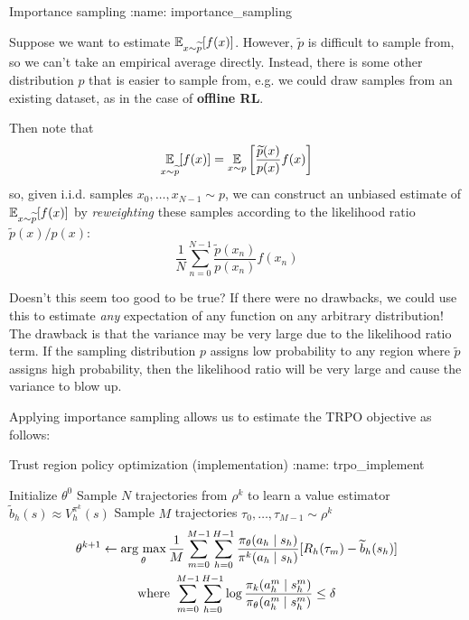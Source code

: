 \documentclass[\main/main]{subfiles}
\begin{document}
\begin{definition}{Importance sampling}
:name: importance_sampling

    Suppose we want to estimate $\operatorname*{\mathbb{E}}_{x \sim \widetilde p}[f(x)]$.
    However, $\tilde p$ is difficult to sample from, so we can't take an empirical average directly. Instead, there is some other distribution $p$ that is easier to sample from, e.g. we could draw samples from an existing dataset, as in the case of \textbf{offline RL}.

    Then note that
    \[
        \operatorname*{\mathbb{E}}_{x \sim \widetilde p} [f(x)] = \operatorname*{\mathbb{E}}_{x \sim p}\left[ \frac{\widetilde p(x)}{p(x)} f(x) \right]
    \]
    so, given i.i.d. samples $x_0, \dots, x_{N-1} \sim p$, we can construct an unbiased estimate of $\operatorname*{\mathbb{E}}_{x \sim \widetilde p} [f(x)]$ by \emph{reweighting} these samples according to the likelihood ratio $\tilde p(x)/p(x)$:
    \[
        \frac{1}{N} \sum_{n=0}^{N-1} \frac{\tilde p(x_n)}{p(x_n)} f(x_n)
    \]

    Doesn't this seem too good to be true? If there were no drawbacks, we could use this to estimate \emph{any} expectation of any function on any arbitrary distribution!
    The drawback is that the variance may be very large due to the likelihood ratio term. If the sampling distribution $p$ assigns low probability to any region where $\tilde p$ assigns high probability, then the likelihood ratio will be very large and cause the variance to blow up.
\end{definition}

Applying importance sampling allows us to estimate the TRPO objective as follows:

\begin{definition}{Trust region policy optimization (implementation)}
:name: trpo_implement

    \begin{algorithmic}
        \State Initialize $\theta^0$
        \State Sample $N$ trajectories from $\rho^k$ to learn a value estimator $\tilde b_h(s) \approx V^{\pi^k}_h(s)$
        \State Sample $M$ trajectories $\tau_0, \dots, \tau_{M-1} \sim \rho^k$
        \State \begin{gather*}
            \theta^{k+1} \gets \operatorname*{\textrm{arg\ max}}_{\theta} \frac{1}{M} \sum_{m=0}^{M-1} \sum_{h=0}^{H-1} \frac{\pi_\theta(a_h \mid s_h)}{\pi^k(a_h \mid s_h)} [ R_h(\tau_m) - \widetilde b_h(s_h) ] \\
            \text{where } \sum_{m=0}^{M-1} \sum_{h=0}^{H-1} \log \frac{\pi_k(a_h^m \mid s_h^m)}{\pi_\theta(a_h^m \mid s_h^m)} \le \delta
        \end{gather*}
        \EndFor
    \end{algorithmic}
\end{definition}
\end{document}
